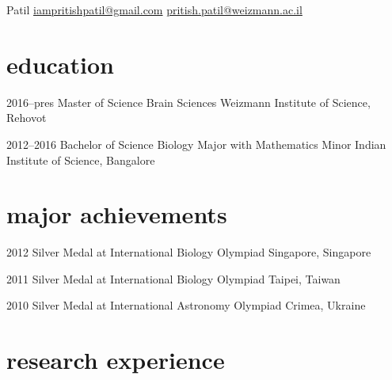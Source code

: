 \documentclass[11pt,print]{friggeri-cv}%
\begin{document}
 {Patil} 
        {\href{mailto:iampritishpatil@gmail.com}{iampritishpatil@gmail.com}\quad  
    \href{mailto:pritish.patil@weizmann.ac.il}{pritish.patil@weizmann.ac.il}
}




\section{education}

\begin{entrylist}
  \entryyy
    {2016--pres}
    {Master of Science {\normalfont Brain Sciences }  }
    {Weizmann Institute of Science, Rehovot}

  \entryyy
    {2012--2016}
    {Bachelor of Science {\normalfont Biology Major with Mathematics Minor }  }
    {Indian Institute of Science, Bangalore}
\end{entrylist}


\section{major achievements}
\begin{entrylist}
  \entryyy
    {2012}
    { {\normalfont Silver Medal at }International Biology Olympiad     }
    {Singapore, Singapore}
    
  \entryyy
    {2011}
    {  {\normalfont Silver Medal at }International Biology Olympiad}
    {Taipei, Taiwan}
    
  \entryyy
    {2010}
    { {\normalfont Silver Medal at }International Astronomy Olympiad }
    {Crimea, Ukraine}



\end{entrylist}

\section{research experience}
\end{document}
